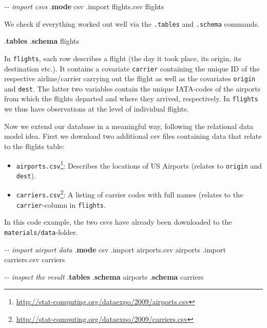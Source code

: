 \documentclass[
  12pt,
]{style/krantz}
\newenvironment{Shaded}{\begin{snugshade}}{\end{snugshade}}
\newcommand{\CommentTok}[1]{\textcolor[rgb]{0.56,0.35,0.01}{\textit{#1}}}
\newcommand{\KeywordTok}[1]{\textcolor[rgb]{0.13,0.29,0.53}{\textbf{#1}}}
\newcommand{\NormalTok}[1]{#1}
\providecommand{\tightlist}{%
  \setlength{\itemsep}{0pt}\setlength{\parskip}{0pt}}
\renewcommand{\href}[2]{#2\footnote{\url{#1}}}
\begin{document}
\begin{Shaded}
\begin{Highlighting}[]
\CommentTok{{-}{-} import csvs}
\NormalTok{.}\KeywordTok{mode}\NormalTok{ csv}
\NormalTok{.import flights.csv flights}
\end{Highlighting}
\end{Shaded}

We check if everything worked out well via the \texttt{.tables} and \texttt{.schema} commands.

\begin{Shaded}
\begin{Highlighting}[]
\NormalTok{.}\KeywordTok{tables}
\NormalTok{.}\KeywordTok{schema}\NormalTok{ flights}
\end{Highlighting}
\end{Shaded}

In \texttt{flights}, each row describes a flight (the day it took place, its origin, its destination etc.). It contains a covariate \texttt{carrier} containing the unique ID of the respective airline/carrier carrying out the flight as well as the covariates \texttt{origin} and \texttt{dest}. The latter two variables contain the unique IATA-codes of the airports from which the flights departed and where they arrived, respectively. In \texttt{flights} we thus have observations at the level of individual flights.

Now we extend our database in a meaningful way, following the relational data model idea. First we download two additional csv files containing data that relate to the flights table:

\begin{itemize}
\tightlist
\item
  \href{http://stat-computing.org/dataexpo/2009/airports.csv}{\texttt{airports.csv}}: Describes the locations of US Airports (relates to \texttt{origin} and \texttt{dest}).
\item
  \href{http://stat-computing.org/dataexpo/2009/carriers.csv}{\texttt{carriers.csv}}: A listing of carrier codes with full names (relates to the \texttt{carrier}-column in \texttt{flights}.
\end{itemize}

In this code example, the two csvs have already been downloaded to the \texttt{materials/data}-folder.

\begin{Shaded}
\begin{Highlighting}[]
\CommentTok{{-}{-} import airport data}
\NormalTok{.}\KeywordTok{mode}\NormalTok{ csv}
\NormalTok{.import airports.csv airports}
\NormalTok{.import carriers.csv carriers}

\CommentTok{{-}{-} inspect the result}
\NormalTok{.}\KeywordTok{tables}
\NormalTok{.}\KeywordTok{schema}\NormalTok{ airports}
\NormalTok{.}\KeywordTok{schema}\NormalTok{ carriers}
\end{Highlighting}
\end{Shaded}
\end{document}
